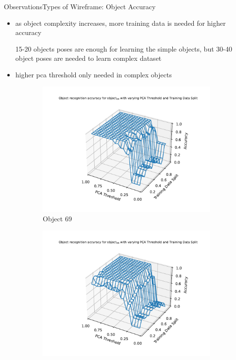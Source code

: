 \documentclass[aspectratio=169, handout, 10pt, hyperref=colorlinks]{beamer}
\begin{document}
\begin{frame}{Observations}{Types of Wireframe: Object Accuracy}
\begin{itemize}
    \item as object complexity increases, more training data is needed for higher accuracy

    15-20 objects poses are enough for learning the simple objects, but 30-40 object poses are needed to learn complex dataset
    \item higher pca threshold only needed in complex objects
\end{itemize}
    \begin{figure}
        \centering
        \begin{subfigure}{0.32\linewidth}
            \centering
            \includegraphics[width=1.2\linewidth]{wireframe/object/69.pdf}
            \caption{Object 69}
        \end{subfigure}
        \begin{subfigure}{0.32\linewidth}
            \centering
            \includegraphics[width=1.2\linewidth]{wireframe/object/98.pdf}

\end{subfigure}
\end{figure}
\end{frame}
\end{document}
